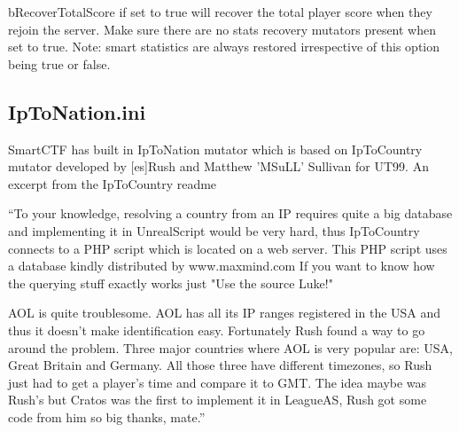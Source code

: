 \documentclass{article}
\begin{document}
bRecoverTotalScore if set to true will recover the total player score when they rejoin the server.  Make sure there are no stats recovery mutators present when set to true.  Note: smart statistics are always restored irrespective of this option being true or false.

\subsection{IpToNation.ini}
SmartCTF has built in IpToNation mutator which is based on IpToCountry mutator developed by [es]Rush and Matthew 'MSuLL' Sullivan for UT99.  An excerpt from the IpToCountry readme

\begin{displayquote}
 ``To your knowledge, resolving a country from an IP requires quite a big database and implementing
it in UnrealScript would be very hard, thus IpToCountry connects to a PHP script which is located
on a web server. This PHP script uses a database kindly distributed by www.maxmind.com
If you want to know how the querying stuff exactly works just "Use the source Luke!"

AOL is quite troublesome. AOL has all its IP ranges registered in the USA and thus it doesn't
make identification easy. Fortunately Rush found a way to go around the problem.
Three major countries where AOL is very popular are: USA, Great Britain and Germany. All those three have
different timezones, so Rush just had to get a player's time and compare it to GMT. The idea maybe was Rush's
but Cratos was the first to implement it in LeagueAS, Rush got some code from him so big thanks, mate.''
\end{displayquote}
\end{document}
